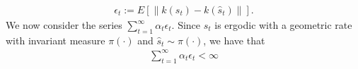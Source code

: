 \documentclass[twoside,11pt]{article}
\begin{document}
\begin{align*}
\epsilon_t:= E\left[  \|k(s_t) - k(\hat{s}_t)\| \right].
\end{align*}
We now consider the series $\sum_{t=1}^\infty \alpha_t \epsilon_t$. Since $s_t$ is ergodic with a geometric rate with invariant measure $\pi(\cdot)$ and $\hat{s}_t\sim \pi(\cdot)$, we have that
\begin{align}\label{erg_ces_sum}
\sum_{t=1}^\infty \alpha_t\epsilon_t <\infty
\end{align}
\end{document}
